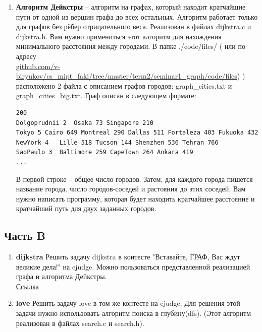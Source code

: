 \documentclass[12pt]{article}
\begin{document}
\begin{enumerate}
\item \textbf{Алгоритм Дейкстры} -- алгоритм на графах, который находит кратчайшие пути от одной из вершин графа до всех остальных. Алгоритм работает только для графов без рёбер отрицательного веса. Реализован в файлах dijkstra.c и dijkstra.h. Вам нужно примениться этот алгоритм для нахождения минимального расстояния между городами. В папке ./code/files/ ( или по адресу \\ \href{github.com/v-biryukov/cs_mipt_faki/tree/master/term2/seminar1_graph/code/files}{github.com/v-biryukov/cs\_mipt\_faki/tree/master/term2/seminar1\_graph/code/files}) ) расположено 2 файла с описанием графов городов: graph\_cities.txt и graph\_cities\_big.txt. Граф описан в следующем формате:
\begin{verbatim}
200
Dolgoprudnii 2	Osaka 73 Singapore 210 
Tokyo 5	Cairo 649 Montreal 290 Dallas 511 Fortaleza 403 Fukuoka 432 
NewYork 4	Lille 518 Tucson 144 Shenzhen 536 Tehran 766 
SaoPaulo 3	Baltimore 259 CapeTown 264 Ankara 419
...
\end{verbatim}
В первой строке -- общее число городов. Затем, для каждого города пишется название города, число городов-соседей и растояния до этих соседей. Вам нужно написать программу, которая будет находить кратчайшее расстояние и кратчайший путь для двух заданных городов.

\end{enumerate}

\subsection*{Часть B}
\begin{enumerate}
\item \textbf{dijkstra} Решить задачу dijkstra в контесте "Вставайте, ГРАФ, Вас ждут великие дела!" на ejudge. Можно пользоваться представленной реализацией графа и алгоритма Дейкстры.\\
\href{http://93.175.29.68/cgi-bin/new-register?action=211&contest_id=500109}{Ссылка}
\item \textbf{love} Решить задачу love в том же контесте на ejudge. Для решения этой задачи нужно использовать алгоритм поиска в глубину(dfs). (Этот алгоритм реализован в файлах search.c и search.h).
\end{enumerate}
\end{document}
